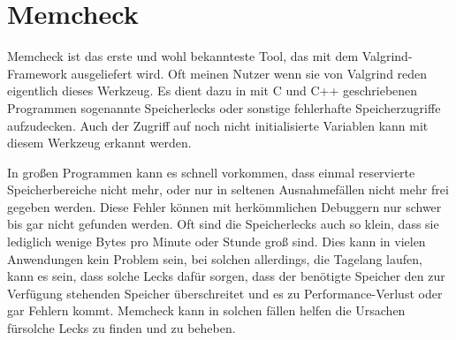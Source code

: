 \section{Memcheck}
Memcheck ist das erste und wohl bekannteste Tool, das mit dem Valgrind-Framework ausgeliefert wird. Oft meinen Nutzer wenn sie von Valgrind reden eigentlich dieses Werkzeug. Es dient dazu in mit C und C++ geschriebenen Programmen sogenannte Speicherlecks oder sonstige fehlerhafte Speicherzugriffe aufzudecken. Auch der Zugriff auf noch nicht initialisierte Variablen kann mit diesem Werkzeug erkannt werden.

In großen Programmen kann es schnell vorkommen, dass einmal reservierte Speicherbereiche nicht mehr, oder nur in seltenen Ausnahmefällen nicht mehr frei gegeben werden. Diese Fehler können mit herkömmlichen Debuggern nur schwer bis gar nicht gefunden werden. Oft sind die Speicherlecks auch so klein, dass sie lediglich wenige Bytes pro Minute oder Stunde groß sind. Dies kann in vielen Anwendungen kein Problem sein, bei solchen allerdings, die Tagelang laufen, kann es sein, dass solche Lecks dafür sorgen, dass der benötigte Speicher den zur Verfügung stehenden Speicher überschreitet und es zu Performance-Verlust oder gar Fehlern kommt. Memcheck kann in solchen fällen helfen die Ursachen für\onehalfspacing solche Lecks zu finden und zu beheben.

